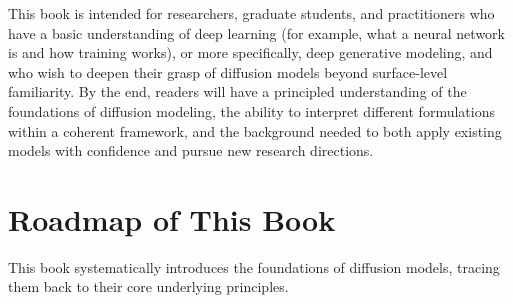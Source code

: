 This book is intended for researchers, graduate students, and practitioners who have a basic understanding of deep learning (for example, what a neural network is and how training works), or more specifically, deep generative modeling, and who wish to deepen their grasp of diffusion models beyond surface-level familiarity. By the end, readers will have a principled understanding of the foundations of diffusion modeling, the ability to interpret different formulations within a coherent framework, and the background needed to both apply existing models with confidence and pursue new research directions.




\section*{\centering \Large Roadmap of This Book}

This book systematically introduces the foundations of diffusion models, tracing them back to their core underlying principles.


